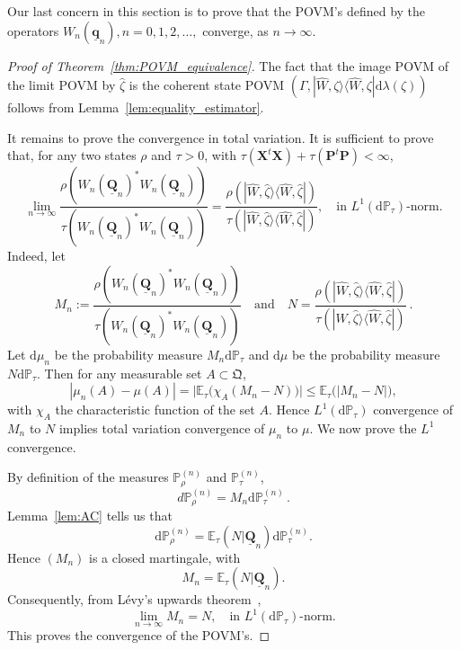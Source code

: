 \documentclass[12pt]{article}
\newcommand{\ket}[1]{|{#1}\rangle}
\newcommand{\bra}[1]{\langle{#1}|}
\renewcommand{\d}{{\mathrm d}}
\begin{document}
Our last concern in this section is to prove that the POVM's defined by the operators $W_n(\underline{\mathbf q}_n), n=0,1,2,\dots,$ converge, as $n\rightarrow \infty$.
\begin{proof}[Proof of Theorem~\ref{thm:POVM_equivalence}]
	The fact that the image POVM of the limit POVM by $\widehat{\zeta}$ is the coherent state POVM $(\Gamma,\ket{\widehat{W},\zeta}\bra{\widehat{W},\zeta}\d\lambda(\zeta))$ follows from Lemma~\ref{lem:equality_estimator}. 
	
	It remains to prove the convergence in total variation. It is sufficient to prove that, for any two states $\rho$ and $\tau>0$, with $\tau(\mathbf{X}^t\mathbf{X})+\tau(\mathbf{P}^t\mathbf{P})<\infty$,
	$$\lim_{n\to\infty}\frac{\rho(W_n(\underline{\mathbf Q}_n)^*W_n(\underline{\mathbf Q}_n))}{\tau(W_n(\underline{\mathbf Q}_n)^*W_n(\underline{\mathbf Q}_n))}=\frac{\rho(\ket{\widehat W,\widehat \zeta}\bra{\widehat W,\widehat \zeta})}{\tau(\ket{\widehat W,\widehat \zeta}\bra{\widehat W,\widehat \zeta})},\quad \mbox{in }L^1(\d\mathbb P_\tau)\mbox{-norm}.$$
	Indeed, let 
	$$M_n:=\frac{\rho(W_n(\underline{\mathbf Q}_n)^*W_n(\underline{\mathbf Q}_n))}{\tau(W_n(\underline{\mathbf Q}_n)^*W_n(\underline{\mathbf Q}_n))}\quad\mbox{and}\quad N=\frac{\rho(\ket{\widehat W,\widehat \zeta}\bra{\widehat W,\widehat \zeta})}{\tau(\ket{\widehat W,\widehat \zeta}\bra{\widehat W,\widehat \zeta})}\,.$$
	Let $\d \mu_n$ be the probability measure $M_n\d\mathbb P_\tau$ and $\d \mu$ be the probability measure $N\d\mathbb P_{\tau}$.
	Then for any measurable set $A\subset\mathfrak Q$,
	$$|\mu_n(A)-\mu(A)|=\big|\mathbb E_\tau\big(\chi_{A}(M_n-N)\big)\big|\leq \mathbb E_\tau\big(\big|M_n-N\big|\big),$$
	with $\chi_A$ the characteristic function of the set $A$.
	Hence $L^1(\d\mathbb P_\tau)$ convergence of $M_n$ to $N$ implies total variation convergence of $\mu_n$ to $\mu$. We now prove the $L^1$ convergence. 
	
	By definition of the measures $\mathbb P_\rho^{(n)}$ and $\mathbb P_\tau^{(n)}$,
	$$d\mathbb P_\rho^{(n)}=M_n\d\mathbb P_\tau^{(n)}\,.$$
	Lemma~\ref{lem:AC} tells us that
	$$\d\mathbb P_\rho^{(n)}=\mathbb E_\tau\left(N|\underline{\mathbf Q}_n\right)\d\mathbb P_\tau^{(n)}.$$
	Hence $(M_n)$ is a closed martingale, with
	$$M_n=\mathbb E_\tau\left(N|\underline{\mathbf Q}_n\right).$$
	Consequently, from L\'evy's upwards theorem~\cite[Theorem 27.3]{JacodProtter},
	$$\lim_{n\to\infty}M_n=N,\quad
	\mbox{in } L^1(\d\mathbb P_\tau)\mbox{-norm}.$$
	This proves the convergence of the POVM's. 
\end{proof}
\end{document}
